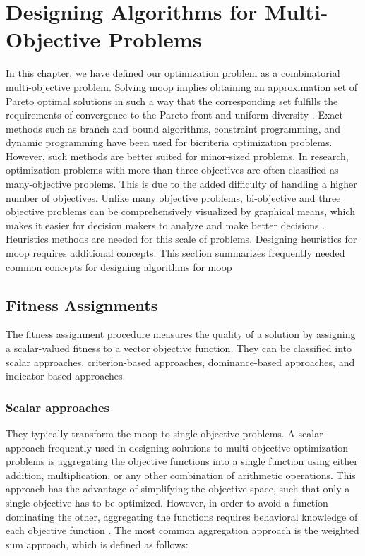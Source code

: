 \section{Designing Algorithms for Multi-Objective Problems}
In this chapter, we have defined our optimization problem as a combinatorial multi-objective problem. Solving \gls{moop} implies obtaining an approximation set of Pareto optimal solutions in such a way that the corresponding set fulfills the requirements of convergence to the Pareto front and
uniform diversity \parencite{Talbi2009Metaheuristics:Implementation}. Exact methods such as branch and bound algorithms, constraint programming, and dynamic programming have been used for bicriteria optimization problems. However, such methods are better suited for minor-sized problems. In research, optimization problems with more than three objectives are often classified as many-objective problems. This is due to the added difficulty of handling a higher number of objectives. Unlike many objective problems, bi-objective and three objective problems can be comprehensively visualized by graphical means, which makes it easier for decision makers to analyze and make better decisions \parencite{Deb2013AnConstraints}. Heuristics methods are needed for this scale of problems. Designing heuristics for \gls{moop} requires additional concepts. This section summarizes frequently needed common concepts for designing algorithms for \gls{moop}


\subsection{Fitness Assignments}
The fitness assignment procedure measures the quality of a solution by assigning a scalar-valued fitness to a vector objective function. They can be classified into scalar approaches, criterion-based approaches, dominance-based approaches, and indicator-based approaches.

\subsubsection{Scalar approaches}
They typically transform the \gls{moop} to single-objective problems. A scalar approach frequently used in designing solutions to multi-objective optimization problems is aggregating the objective functions into a single function using either addition, multiplication, or any other combination of arithmetic operations. This approach has the advantage of simplifying the objective space, such that only a single objective has to be optimized. However, in order to avoid a function dominating the other, aggregating the functions requires behavioral knowledge of each objective function \parencite{CoelloCoello1999ATechniquesc}. The most common aggregation approach is the weighted sum approach, which is defined as follows:

